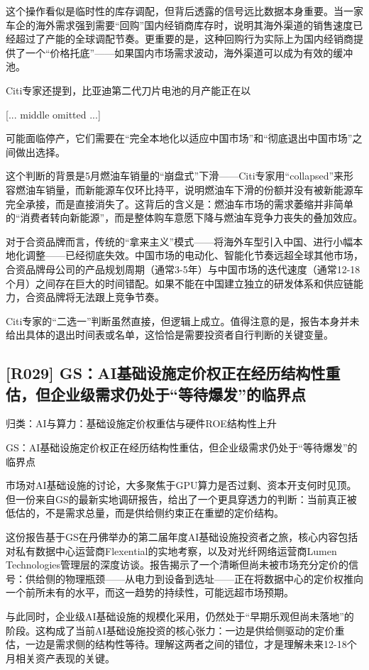 \documentclass[11pt]{ctexart}
\begin{document}
这个操作看似是临时性的库存调配，但背后透露的信号远比数据本身重要。当一家车企的海外需求强到需要“回购”国内经销商库存时，说明其海外渠道的销售速度已经超过了产能的全球调配节奏。更重要的是，这种回购行为实际上为国内经销商提供了一个“价格托底”——如果国内市场需求波动，海外渠道可以成为有效的缓冲池。

Citi专家还提到，比亚迪第二代刀片电池的月产能正在以

[... middle omitted ...]

可能面临停产，它们需要在“完全本地化以适应中国市场”和“彻底退出中国市场”之间做出选择。

这个判断的背景是5月燃油车销量的“崩盘式”下滑——Citi专家用“collapsed”来形容燃油车销量，而新能源车仅环比持平，说明燃油车下滑的份额并没有被新能源车完全承接，而是直接消失了。这背后的含义是：燃油车市场的需求萎缩并非简单的“消费者转向新能源”，而是整体购车意愿下降与燃油车竞争力丧失的叠加效应。

对于合资品牌而言，传统的“拿来主义”模式——将海外车型引入中国、进行小幅本地化调整——已经彻底失效。中国市场的电动化、智能化节奏远超全球其他市场，合资品牌母公司的产品规划周期（通常3-5年）与中国市场的迭代速度（通常12-18个月）之间存在巨大的时间错配。如果不能在中国建立独立的研发体系和供应链能力，合资品牌将无法跟上竞争节奏。

Citi专家的“二选一”判断虽然直接，但逻辑上成立。值得注意的是，报告本身并未给出具体的退出时间表或名单，这恰恰是需要投资者自行判断的关键变量。

\subsection{[R029] GS：AI基础设施定价权正在经历结构性重估，但企业级需求仍处于“等待爆发”的临界点}
{\small\color{refgray}归类：AI与算力：基础设施定价权重估与硬件ROE结构性上升}

GS：AI基础设施定价权正在经历结构性重估，但企业级需求仍处于“等待爆发”的临界点

市场对AI基础设施的讨论，大多聚焦于GPU算力是否过剩、资本开支何时见顶。但一份来自GS的最新实地调研报告，给出了一个更具穿透力的判断：当前真正被低估的，不是需求总量，而是供给侧约束正在重塑的定价结构。

这份报告基于GS在丹佛举办的第二届年度AI基础设施投资者之旅，核心内容包括对私有数据中心运营商Flexential的实地考察，以及对光纤网络运营商Lumen Technologies管理层的深度访谈。报告揭示了一个清晰但尚未被市场充分定价的信号：供给侧的物理瓶颈——从电力到设备到选址——正在将数据中心的定价权推向一个前所未有的水平，而这一趋势的持续性，可能远超市场预期。

与此同时，企业级AI基础设施的规模化采用，仍然处于“早期乐观但尚未落地”的阶段。这构成了当前AI基础设施投资的核心张力：一边是供给侧驱动的定价重估，一边是需求侧的结构性等待。理解这两者之间的错位，才是理解未来12-18个月相关资产表现的关键。
\end{document}
